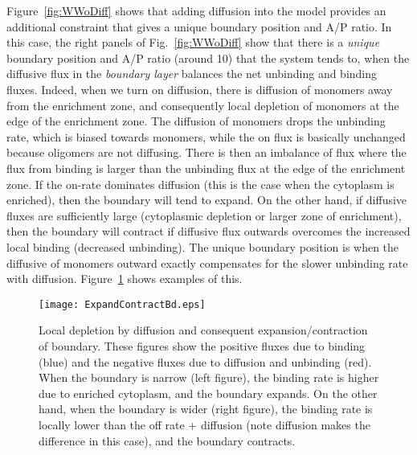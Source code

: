 \documentclass[11pt]{article}
\newcommand{\6}[1]{#1_{\text{6}}}
\newcommand{\3}[1]{#1_{\text{3}}}
\begin{document}
Figure\ \ref{fig:WWoDiff} shows that adding diffusion into the model provides an additional constraint that gives a unique boundary position and A/P ratio. In this case, the right panels of Fig.\ \ref{fig:WWoDiff} show that there is a \emph{unique} boundary position and A/P ratio (around 10) that the system tends to, when the diffusive flux in the \emph{boundary layer} balances the net unbinding and binding fluxes. Indeed, when we turn on diffusion, there is diffusion of monomers away from the enrichment zone, and consequently local depletion of monomers at the edge of the enrichment zone. The diffusion of monomers drops the unbinding rate, which is biased towards monomers, while the on flux is basically unchanged because oligomers are not diffusing. There is then an imbalance of flux where the flux from binding is larger than the unbinding flux at the edge of the enrichment zone. If the on-rate dominates diffusion (this is the case when the cytoplasm is enriched), then the boundary will tend to expand. On the other hand, if diffusive fluxes are sufficiently large (cytoplasmic depletion or larger zone of enrichment), then the boundary will contract if diffusive flux outwards overcomes the increased local binding (decreased unbinding). The unique boundary position is when the diffusive of monomers outward exactly compensates for the slower unbinding rate with diffusion. Figure\ \ref{fig:ExpContrBd} shows examples of this.

\begin{figure}
\centering
\texttt{[image: ExpandContractBd.eps]}
\caption{\label{fig:ExpContrBd}Local depletion by diffusion and consequent expansion/contraction of boundary. These figures show the positive fluxes due to binding (blue) and the negative fluxes due to diffusion and unbinding (red). When the boundary is narrow (left figure), the binding rate is higher due to enriched cytoplasm, and the boundary expands. On the other hand, when the boundary is wider (right figure), the binding rate is locally lower than the off rate + diffusion (note diffusion makes the difference in this case), and the boundary contracts. }
\end{figure}
\end{document}
